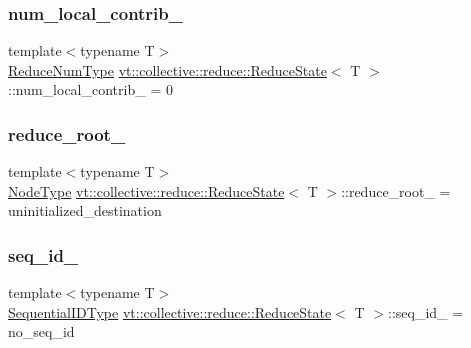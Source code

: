\subsubsection{\texorpdfstring{num\+\_\+local\+\_\+contrib\+\_\+}{num\_local\_contrib\_}}
{\footnotesize\ttfamily template$<$typename T$>$ \\
\hyperlink{structvt_1_1collective_1_1reduce_1_1_reduce_state_adda7ff0ae58325a43a0a8bad447a8bfb}{Reduce\+Num\+Type} \hyperlink{structvt_1_1collective_1_1reduce_1_1_reduce_state}{vt\+::collective\+::reduce\+::\+Reduce\+State}$<$ T $>$\+::num\+\_\+local\+\_\+contrib\+\_\+ = 0}

\mbox{\label{structvt_1_1collective_1_1reduce_1_1_reduce_state_a02a1d24c695eeac20c840fdf2d629dc6}} 
\subsubsection{\texorpdfstring{reduce\+\_\+root\+\_\+}{reduce\_root\_}}
{\footnotesize\ttfamily template$<$typename T$>$ \\
\hyperlink{namespacevt_a866da9d0efc19c0a1ce79e9e492f47e2}{Node\+Type} \hyperlink{structvt_1_1collective_1_1reduce_1_1_reduce_state}{vt\+::collective\+::reduce\+::\+Reduce\+State}$<$ T $>$\+::reduce\+\_\+root\+\_\+ = uninitialized\+\_\+destination}

\mbox{\label{structvt_1_1collective_1_1reduce_1_1_reduce_state_a05893a4850acf7457ce1de6f7559b137}} 
\subsubsection{\texorpdfstring{seq\+\_\+id\+\_\+}{seq\_id\_}}
{\footnotesize\ttfamily template$<$typename T$>$ \\
\hyperlink{namespacevt_a3063d4db3b879d6dd2c7b8d50995c7f6}{Sequential\+I\+D\+Type} \hyperlink{structvt_1_1collective_1_1reduce_1_1_reduce_state}{vt\+::collective\+::reduce\+::\+Reduce\+State}$<$ T $>$\+::seq\+\_\+id\+\_\+ = no\+\_\+seq\+\_\+id}

